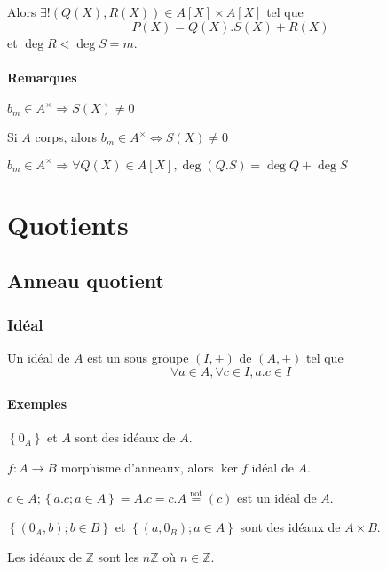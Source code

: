 \documentclass[reqno,a4paper,10pt]{report}
\makeatletter
\newcommand{\set}[1]{\left\lbrace #1 \right\rbrace} %
\newcommand{\IZ}{\ensuremath{\mathbb{Z}}\xspace} %
\newcommand{\so}{\Rightarrow}
\let\olditemize=\itemize%
\renewenvironment{itemize}{%
    \olditemize%
  }{%
    \@noparlisttrue%
    \endlist%
  }%
\makeatother
\begin{document}
Alors $\exists ! (Q(X), R(X)) \in A[X] \times A[X]$ tel que
\[P(X) = Q(X) . S(X) + R(X)\]
et $\deg R < \deg S = m$.

\begin{comment}
  Preuve 07/10/09 p2 verso
\end{comment}

\paragraph{Remarques}
\begin{itemize}
  \item $b_m \in A^\times \so S(X) \neq 0$
  \item Si $A$ corps, alors $b_m \in A^\times \iff S(X)\neq 0$
  \item $b_m \in A^\times \so \forall Q(X) \in A[X], \deg(Q.S) = \deg Q + \deg
    S$
\end{itemize}

\section{Quotients}
\subsection{Anneau quotient}
\begin{comment}
  Détails, diagramme, 08/10/09 p1 verso.
\end{comment}
\subsubsection{Idéal}
Un idéal de $A$ est un sous groupe $(I,+)$ de $(A,+)$ tel que
\[\forall a \in A, \forall c\in I, a.c \in I\]
\paragraph{Exemples}
\begin{itemize}
  \item $\set{0_A}$ et $A$ sont des idéaux de $A$.
  \item $f:A\to B$ morphisme d'anneaux, alors $\ker f$ idéal de $A$.
  \item $c\in A; \set{a.c; a\in A} = A.c = c.A \overset{\text{not}}{=}(c)$ est
    un idéal de $A$.
  \item $\set{(0_A, b); b \in B}$ et $\set{(a,0_B); a \in A}$ sont des idéaux
    de $A\times B$.
  \item Les idéaux de $\IZ$ sont les $n\IZ$ où $n\in \IZ$.
\end{itemize}
\end{document}
